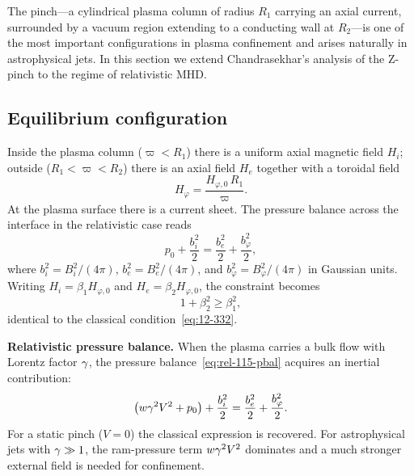 The pinch---a cylindrical plasma column of radius $R_{1}$ carrying an
axial current, surrounded by a vacuum region extending to a conducting
wall at $R_{2}$---is one of the most important configurations in
plasma confinement and arises naturally in astrophysical jets.  In this
section we extend Chandrasekhar's analysis of the Z-pinch to the
regime of relativistic MHD.

\subsection{Equilibrium configuration}
\label{sec:rel-115-equil}

Inside the plasma column ($\varpi < R_{1}$) there is a uniform axial
magnetic field $H_{i}$; outside ($R_{1} < \varpi < R_{2}$) there is
an axial field $H_{e}$ together with a toroidal field
\begin{equation}
\label{eq:rel-115-Hphi}
H_{\varphi} = \frac{H_{\varphi,0}\,R_{1}}{\varpi}.
\end{equation}
At the plasma surface there is a current sheet.  The pressure balance
across the interface in the relativistic case reads
\begin{equation}
\label{eq:rel-115-pbal}
p_{0} + \frac{b_{i}^{2}}{2}
  = \frac{b_{e}^{2}}{2} + \frac{b_{\varphi}^{2}}{2},
\end{equation}
where $b_{i}^{2} = B_{i}^{2}/(4\pi)$, $b_{e}^{2} = B_{e}^{2}/(4\pi)$,
and $b_{\varphi}^{2} = B_{\varphi}^{2}/(4\pi)$ in Gaussian units.
Writing $H_{i} = \beta_{1}H_{\varphi,0}$ and
$H_{e} = \beta_{2}H_{\varphi,0}$, the constraint becomes
\begin{equation}
\label{eq:rel-115-constraint}
1 + \beta_{2}^{2} \ge \beta_{1}^{2},
\end{equation}
identical to the classical condition~\eqref{eq:12-332}.

\begin{relcorrection}
\textbf{Relativistic pressure balance.}
When the plasma carries a bulk flow with Lorentz factor $\gamma$, the
pressure balance~\eqref{eq:rel-115-pbal} acquires an inertial
contribution:
\begin{equation}
\label{eq:rel-115-pbal-rel}
\bigl(w\gamma^{2}V^{2} + p_{0}\bigr) + \frac{b_{i}^{2}}{2}
  = \frac{b_{e}^{2}}{2} + \frac{b_{\varphi}^{2}}{2}.
\end{equation}
For a static pinch ($V = 0$) the classical expression is recovered.
For astrophysical jets with $\gamma \gg 1$, the ram-pressure term
$w\gamma^{2}V^{2}$ dominates and a much stronger external field
is needed for confinement.
\end{relcorrection}


